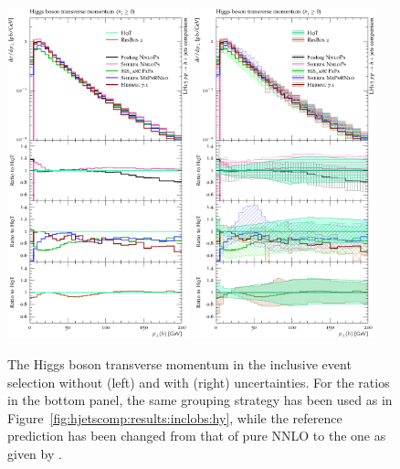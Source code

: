 \begin{figure}[t!]
  \centering
  \includegraphics[width=0.47\textwidth]{figures/hjetscomp_u_H_pT_incl.pdf}
  \hfill
  \includegraphics[width=0.47\textwidth]{figures/hjetscomp_H_pT_incl.pdf}
  \caption{\label{fig:hjetscomp:results:inclobs:hpt}%
    The Higgs boson transverse momentum in the inclusive event
    selection without (left) and with (right) uncertainties. For the
    ratios in the bottom panel, the same grouping strategy has been
    used as in Figure~\ref{fig:hjetscomp:results:inclobs:hy}, while
    the reference prediction has been changed from that of pure NNLO
    to the one as given by \hjetscompHqT.}
\end{figure}

